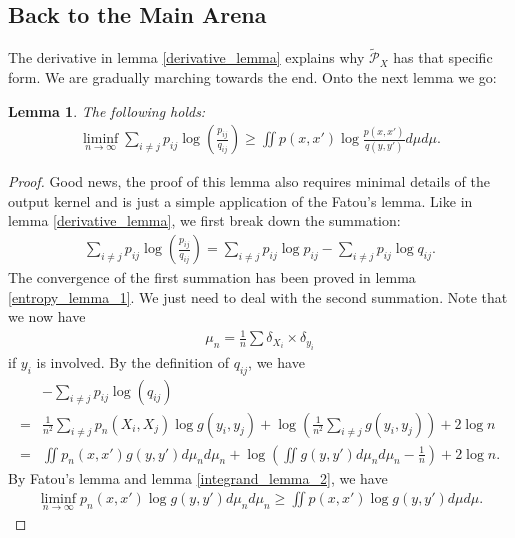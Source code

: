 \documentclass[10pt]{article}
\newtheorem{lemma}{\bf Lemma}
\newenvironment{Proof of lemma}{\noindent{\bf Proof of Lemma}}{\hfill$\Box$\newline}
\newenvironment{Proof of claim}{\noindent{\bf Proof of claim}}{\hfill$\Box$\newline}
\newenvironment{Proof of theorem}{\noindent{\bf Proof of Theorem}}{\hfill\scriptsize{$\Box$}\newline}
\newenvironment{Proof of theorems}{\noindent{\bf Proof of Theorems}}{\hfill$\Box$\newline}
\newenvironment{Proof of proposition}{\noindent{\bf Proof of Proposition}}{\hfill$\Box$\newline}
\newenvironment{Proof of propositions}{\noindent{\bf Proof of Propositions}}{\hfill$\Box$\newline}
\newenvironment{Proof of exercise}{\noindent{\it Proof of Exercise:}}{\hfill$\Box$}
\numberwithin{equation}{section}
\begin{document}
\subsection*{Back to the Main Arena}
The derivative in lemma \ref{derivative_lemma} explains why
$\tilde{\mathcal{{P}}}_X$ has that specific form. We are gradually marching
towards the end. Onto the next lemma we go:
\begin{lemma} \label{lower_bound_lemma_2}
    The following holds:
    \begin{align}
        \liminf_{n \to \infty}\sum_{i \neq j} p_{ij} \log \left(\frac{p_{ij}}{q_{ij}}\right) \geq \iint p(x,x')\log \frac{p(x,x')}{q(y,y')} d\mu d\mu.
    \end{align}
\end{lemma}
\begin{proof}
    Good news, the proof of this lemma also requires minimal details of the output kernel and is just a simple application of the Fatou's lemma. Like in lemma \ref{derivative_lemma}, we first break down the summation:
    \begin{align}
        \sum_{i \neq j} p_{ij} \log \left(\frac{p_{ij}}{q_{ij}}\right) = \sum_{i \neq j} p_{ij} \log p_{ij} - \sum_{i \neq j} p_{ij} \log q_{ij}.
    \end{align}
    The convergence of the first summation has been proved in lemma \ref{entropy_lemma_1}. We just need to deal with the second summation. Note that we now have
    \begin{align}
        \mu_n = \frac{1}{n} \sum \delta_{X_i} \times \delta_{y_i}
    \end{align}
    if $y_i$ is involved. By the definition of $q_{ij}$, we have
    \begin{align} \label{entropy_esti_2}
          & -\sum_{i \neq j}p_{ij} \log(q_{ij}) \nonumber                                                                                             \\
        = & \frac{1}{n^2}\sum_{i \neq j} p_n(X_i,X_j) \log g(y_i,y_j) + \log \left(\frac{1}{n^2}\sum_{i \neq j} g(y_i,y_j)\right) +2 \log n \nonumber \\
        = & \iint p_n(x,x')g(y,y')d\mu_n d\mu_n + \log \left(\iint g(y,y')d\mu_n d\mu_n - \frac{1}{n}\right)+2\log n.
    \end{align}
    By Fatou's lemma and lemma \ref{integrand_lemma_2}, we have
    \begin{align} \label{fatou_esti_1}
        \liminf_{n \to \infty} p_n(x,x')\log g(y,y') d\mu_n d\mu_n \geq  \iint p(x,x')\log g(y,y') d\mu d\mu.

\end{align}
\end{proof}
\end{document}
